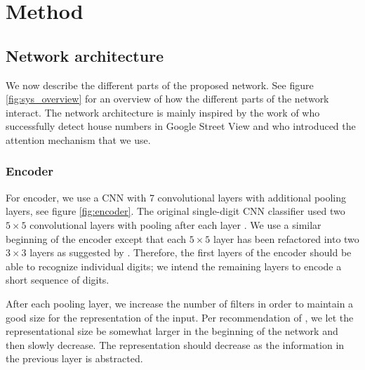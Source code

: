 \section{Method}

\subsection{Network architecture}



We now describe the different parts of the proposed network. See figure \ref{fig:sys_overview} for an overview of how the different parts of the network interact.
The network architecture is mainly inspired by the work of \textcite{multidigit_streetview} who successfully detect house numbers in Google Street View and \textcite{AttendAndTell} who introduced the attention mechanism that we use.

\subsubsection{Encoder}



For encoder, we use a CNN with 7 convolutional layers with additional pooling layers, see figure \ref{fig:encoder}.
The original single-digit CNN classifier used two $5 \times 5$ convolutional layers with pooling after each layer \cite{lecun_1989}.
We use a similar beginning of the encoder except that each $5 \times 5$ layer has been refactored into two $3 \times 3$ layers as suggested by \textcite{InceptionV3}. Therefore, the first layers of the encoder should be able to recognize individual digits; we intend the remaining layers to encode a short sequence of digits.


After each pooling layer, we increase the number of filters in order to maintain a good size for the representation of the input. Per recommendation of \textcite{InceptionV3}, we let the representational size be somewhat larger in the beginning of the network and then slowly decrease. The representation should decrease as the information in the previous layer is abstracted.

